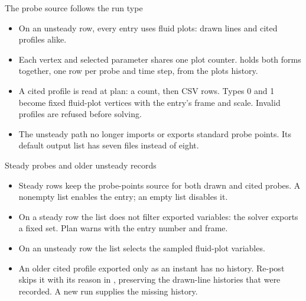 \begin{frame}{The probe source follows the run type}
\begin{itemize}\small
  \item On an unsteady row, every \code{[[probes]]} entry uses fluid plots:
        drawn lines and cited  profiles alike.
  \item Each vertex and selected parameter shares one plot counter.
         holds both forms together,
        one row per probe and time step, from the plots history.
  \item A cited profile is read at plan: a count, then 
        CSV rows. Types 0 and 1 become fixed fluid-plot vertices with the
        entry's frame and scale. Invalid profiles are refused before solving.
  \item The unsteady path no longer imports or exports standard probe points.
        Its default output list has seven files instead of eight.
\end{itemize}
\end{frame}

\begin{frame}{Steady probes and older unsteady records}
\begin{itemize}\small
  \item Steady rows keep the probe-points source for both drawn and cited probes.
        A nonempty  list enables the entry; an empty list disables it.
  \item On a steady row the list does not filter exported variables:
        the solver exports a fixed set. Plan warns with the entry number and frame.
  \item On an unsteady row the list selects the sampled fluid-plot variables.
  \item An older cited profile exported only as an instant has no history.
        Re-post skips it with its reason in , preserving
        the drawn-line histories that were recorded. A new run supplies
        the missing history.
\end{itemize}
\end{frame}

